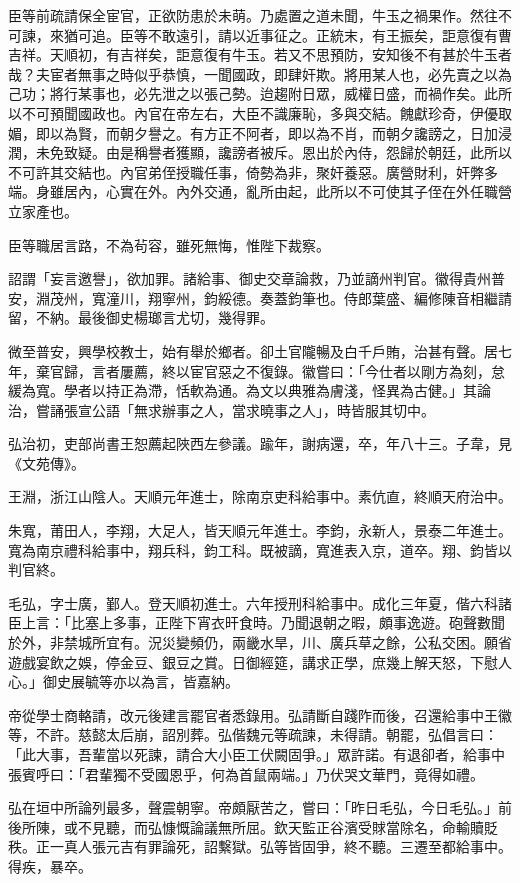 \begin{pinyinscope}
臣等前疏請保全宦官，正欲防患於未萌。乃處置之道未聞，牛玉之禍果作。然往不可諫，來猶可追。臣等不敢遠引，請以近事征之。正統末，有王振矣，詎意復有曹吉祥。天順初，有吉祥矣，詎意復有牛玉。若又不思預防，安知後不有甚於牛玉者哉？夫宦者無事之時似乎恭慎，一聞國政，即肆奸欺。將用某人也，必先賣之以為己功；將行某事也，必先泄之以張己勢。迨趨附日眾，威權日盛，而禍作矣。此所以不可預聞國政也。內官在帝左右，大臣不識廉恥，多與交結。餽獻珍奇，伊優取媚，即以為賢，而朝夕譽之。有方正不阿者，即以為不肖，而朝夕讒謗之，日加浸潤，未免致疑。由是稱譽者獲顯，讒謗者被斥。恩出於內侍，怨歸於朝廷，此所以不可許其交結也。內官弟侄授職任事，倚勢為非，聚奸養惡。廣營財利，奸弊多端。身雖居內，心實在外。內外交通，亂所由起，此所以不可使其子侄在外任職營立家產也。

臣等職居言路，不為茍容，雖死無悔，惟陛下裁察。

詔謂「妄言邀譽」，欲加罪。諸給事、御史交章論救，乃並謫州判官。徽得貴州普安，淵茂州，寬潼川，翔寧州，鈞綏德。奏蓋鈞筆也。侍郎葉盛、編修陳音相繼請留，不納。最後御史楊瑯言尤切，幾得罪。

微至普安，興學校教士，始有舉於鄉者。卻土官隴暢及白千戶賄，治甚有聲。居七年，棄官歸，言者屢薦，終以宦官惡之不復錄。徽嘗曰：「今仕者以剛方為刻，怠緩為寬。學者以持正為滯，恬軟為通。為文以典雅為膚淺，怪異為古健。」其論治，嘗誦張宣公語「無求辦事之人，當求曉事之人」，時皆服其切中。

弘治初，吏部尚書王恕薦起陜西左參議。踰年，謝病還，卒，年八十三。子韋，見《文苑傳》。

王淵，浙江山陰人。天順元年進士，除南京吏科給事中。素伉直，終順天府治中。

朱寬，莆田人，李翔，大足人，皆天順元年進士。李鈞，永新人，景泰二年進士。寬為南京禮科給事中，翔兵科，鈞工科。既被謫，寬進表入京，道卒。翔、鈞皆以判官終。

毛弘，字士廣，鄞人。登天順初進士。六年授刑科給事中。成化三年夏，偕六科諸臣上言：「比塞上多事，正陛下宵衣旰食時。乃聞退朝之暇，頗事逸遊。砲聲數聞於外，非禁城所宜有。況災變頻仍，兩畿水旱，川、廣兵草之餘，公私交困。願省遊戲宴飲之娛，停金豆、銀豆之賞。日御經筵，講求正學，庶幾上解天怒，下慰人心。」御史展毓等亦以為言，皆嘉納。

帝從學士商輅請，改元後建言罷官者悉錄用。弘請斷自踐阼而後，召還給事中王徽等，不許。慈懿太后崩，詔別葬。弘偕魏元等疏諫，未得請。朝罷，弘倡言曰：「此大事，吾輩當以死諫，請合大小臣工伏闕固爭。」眾許諾。有退卻者，給事中張賓呼曰：「君輩獨不受國恩乎，何為首鼠兩端。」乃伏哭文華門，竟得如禮。

弘在垣中所論列最多，聲震朝寧。帝頗厭苦之，嘗曰：「昨日毛弘，今日毛弘。」前後所陳，或不見聽，而弘慷慨論議無所屈。欽天監正谷濱受賕當除名，命輸贖貶秩。正一真人張元吉有罪論死，詔繫獄。弘等皆固爭，終不聽。三遷至都給事中。得疾，暴卒。


\end{pinyinscope}
